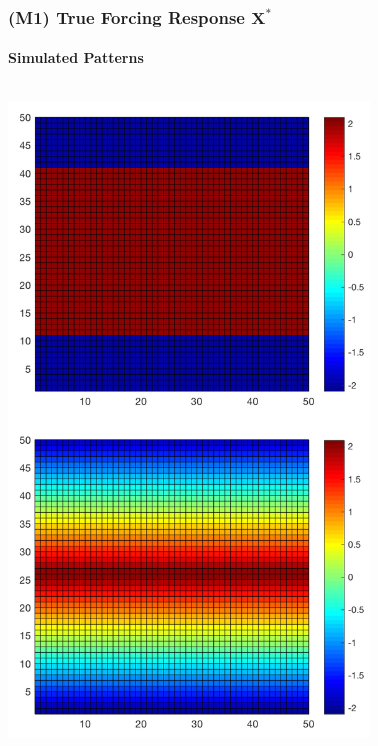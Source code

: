 \documentclass{beamer}
\def\*#1{\bm{#1}}
\begin{document}
\begin{frame}
\frametitle{(M1) True Forcing Response $\*X^*$}
\framesubtitle{Simulated Patterns}

\begin{columns}
\begin{column}{0.5\textwidth}
    \begin{center}
     \includegraphics[width=0.75\textwidth]{Images/simpleXExample.png} %
     \end{center}
\end{column}
\begin{column}{0.5\textwidth}
    \begin{center}

\end{center}
\end{column}
\end{columns}
\end{frame}
\end{document}
